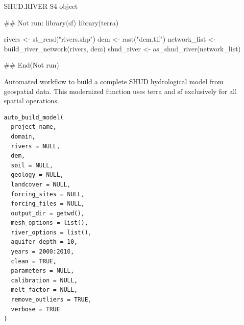 \documentclass[a4paper]{book}
\begin{document}
%
\begin{Value}
SHUD.RIVER S4 object
\end{Value}
%
\begin{Examples}
\begin{ExampleCode}
## Not run: 
library(sf)
library(terra)

rivers <- st_read("rivers.shp")
dem <- rast("dem.tif")
network_list <- build_river_network(rivers, dem)
shud_river <- as_shud_river(network_list)

## End(Not run)
\end{ExampleCode}
\end{Examples}
%
\begin{Description}\relax
Automated workflow to build a complete SHUD hydrological model from
geospatial data. This modernized function uses terra and sf exclusively
for all spatial operations.
\end{Description}
%
\begin{Usage}
\begin{verbatim}
auto_build_model(
  project_name,
  domain,
  rivers = NULL,
  dem,
  soil = NULL,
  geology = NULL,
  landcover = NULL,
  forcing_sites = NULL,
  forcing_files = NULL,
  output_dir = getwd(),
  mesh_options = list(),
  river_options = list(),
  aquifer_depth = 10,
  years = 2000:2010,
  clean = TRUE,
  parameters = NULL,
  calibration = NULL,
  melt_factor = NULL,
  remove_outliers = TRUE,
  verbose = TRUE
)
\end{verbatim}
\end{Usage}
%
\end{document}
